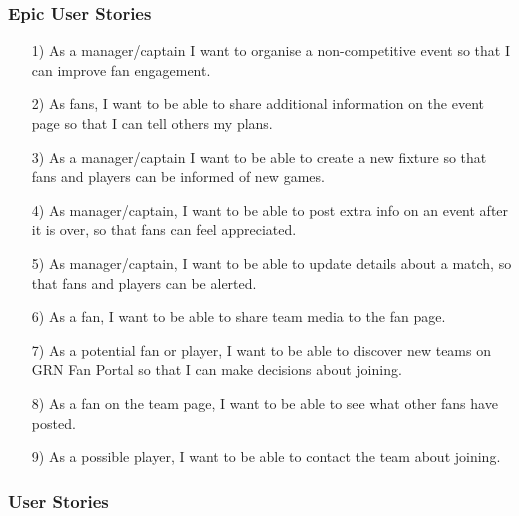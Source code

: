 \documentclass[10pt,a4paper]{article}
\begin{document}
\subsubsection{Epic User Stories}
\begin{itemize}

\item[1)]
As a manager/captain I want to organise a non-competitive event so that I can improve fan engagement.
\item[2)]
As fans, I want to be able to share additional information on the event page so that I can tell others my plans.
\item[3)]
As a manager/captain I want to be able to create a new fixture so that fans and players can be informed of new games.
\item[4)]
As manager/captain, I want to be able to post extra info on an event after it is over, so that fans can feel appreciated.
\item[5)]
As manager/captain, I want to be able to update details about a match, so that fans and players can be alerted.
\item[6)]
As a fan, I want to be able to share team media to the fan page.
\item[7)]
As a potential fan or player, I want to be able to discover new teams on GRN Fan Portal so that I can make decisions about joining.
\item[8)]
As a fan on the team page, I want to be able to see what other fans have posted.
\item[9)]
As a possible player, I want to be able to contact the team about joining.

\end{itemize}

\subsubsection{User Stories}
\end{document}

